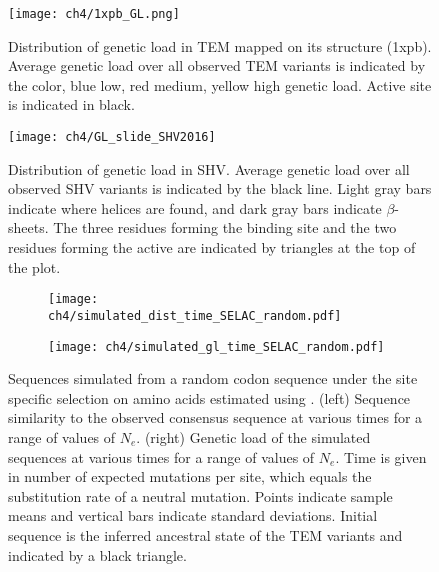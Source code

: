 \null
\vfill
\begin{figure}[H]
     \centering
	\texttt{[image: ch4/1xpb\_GL.png]}
	\caption{Distribution of genetic load in TEM mapped on its structure (1xpb). 
	Average genetic load over all observed TEM variants is indicated by the color, blue low, red medium, yellow high genetic load. Active site is indicated in black.}
	\label{fig:tem2016_3d}
\end{figure}
\null
\vfill
\clearpage
\null
\vfill
\begin{figure}[H]
     \centering
	\texttt{[image: ch4/GL\_slide\_SHV2016]}
	\caption{Distribution of genetic load in SHV. 
	Average genetic load over all observed SHV variants is indicated by the black line. 
	Light gray bars indicate where helices are found, and dark gray bars indicate $\beta$-sheets.
	The three residues forming the binding site and the two residues forming the active are indicated by triangles at the top of the plot.}
	\label{fig:shv2016_sse}
\end{figure}
\null
\vfill
\clearpage
\null
\vfill
\begin{figure}[h]
    \centering
    \begin{subfigure}
        \centering
        \texttt{[image: ch4/simulated\_dist\_time\_SELAC\_random.pdf]}
    \end{subfigure}
    \begin{subfigure}
        \centering
        \texttt{[image: ch4/simulated\_gl\_time\_SELAC\_random.pdf]}
    \end{subfigure}
    \caption{Sequences simulated from a random codon sequence under the site specific selection on amino acids estimated using \selac. 
    (left) Sequence similarity to the observed consensus sequence at various times for a range of values of $N_e$.
    (right) Genetic load of the simulated sequences at various times for a range of values of $N_e$.
    Time is given in number of expected mutations per site, which equals the substitution rate of a neutral mutation.
    Points indicate sample means and vertical bars indicate standard deviations. Initial sequence is the inferred ancestral state of the TEM variants and indicated by a black triangle.}
    \label{fig:selac_sim_rand}
\end{figure}
\null
\vfill
\clearpage
\null
\vfill

